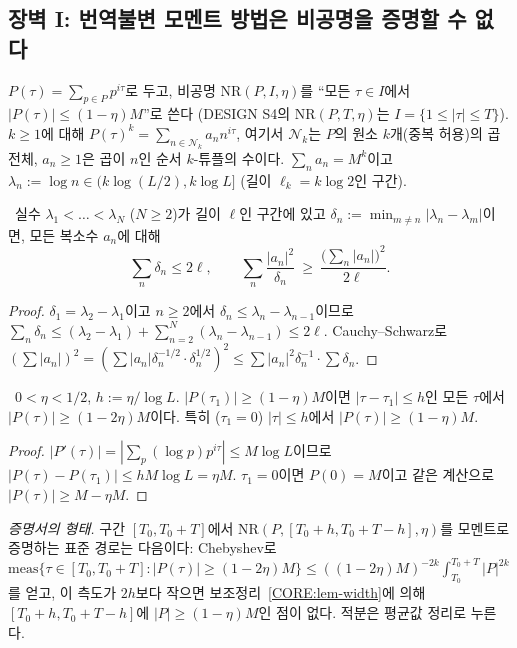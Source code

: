 \subsection{장벽 I: 번역불변 모멘트 방법은 비공명을 증명할 수 없다}
\label{CORE:ssec-barrier1}

$P(\tau)=\sum_{p\in P}p^{i\tau}$로 두고, 비공명 $\mathrm{NR}(P,I,\eta)$를 ``모든 $\tau\in I$에서 $|P(\tau)|\le(1-\eta)M$''로 쓴다 (DESIGN S4의 $\mathrm{NR}(P,T,\eta)$는 $I=\{1\le|\tau|\le T\}$).
$k\ge1$에 대해 $P(\tau)^k=\sum_{n\in\mathcal N_k}a_n n^{i\tau}$, 여기서 $\mathcal N_k$는 $P$의 원소 $k$개(중복 허용)의 곱 전체, $a_n\ge1$은 곱이 $n$인 순서 $k$-튜플의 수이다. $\sum_n a_n=M^k$이고 $\lambda_n:=\log n\in(k\log(L/2),k\log L]$ (길이 $\ell_k=k\log2$인 구간).

\begin{lemma}[간격 합 부등식]\label{CORE:lem-spacing}
\PROVED\ 실수 $\lambda_1<\dots<\lambda_N$ ($N\ge2$)가 길이 $\ell$인 구간에 있고 $\delta_n:=\min_{m\ne n}|\lambda_n-\lambda_m|$이면, 모든 복소수 $a_n$에 대해
\[
\sum_{n}\delta_n\le2\ell,\qquad \sum_n\frac{|a_n|^2}{\delta_n}\ \ge\ \frac{\bigl(\sum_n|a_n|\bigr)^2}{2\ell}.
\]
\end{lemma}
\begin{proof}
$\delta_1=\lambda_2-\lambda_1$이고 $n\ge2$에서 $\delta_n\le\lambda_n-\lambda_{n-1}$이므로 $\sum_n\delta_n\le(\lambda_2-\lambda_1)+\sum_{n=2}^N(\lambda_n-\lambda_{n-1})\le2\ell$. Cauchy–Schwarz로 $(\sum|a_n|)^2=(\sum|a_n|\delta_n^{-1/2}\cdot\delta_n^{1/2})^2\le\sum|a_n|^2\delta_n^{-1}\cdot\sum\delta_n$.
\end{proof}

\begin{lemma}[공명의 폭]\label{CORE:lem-width}
\PROVED\ $0<\eta<1/2$, $h:=\eta/\log L$. $|P(\tau_1)|\ge(1-\eta)M$이면 $|\tau-\tau_1|\le h$인 모든 $\tau$에서 $|P(\tau)|\ge(1-2\eta)M$이다. 특히 ($\tau_1=0$) $|\tau|\le h$에서 $|P(\tau)|\ge(1-\eta)M$.
\end{lemma}
\begin{proof}
$|P'(\tau)|=|\sum_p (\log p)p^{i\tau}|\le M\log L$이므로 $|P(\tau)-P(\tau_1)|\le hM\log L=\eta M$. $\tau_1=0$이면 $P(0)=M$이고 같은 계산으로 $|P(\tau)|\ge M-\eta M$.
\end{proof}

\emph{증명서의 형태.} 구간 $[T_0,T_0+T]$에서 $\mathrm{NR}(P,[T_0+h,T_0+T-h],\eta)$를 모멘트로 증명하는 표준 경로는 다음이다:
Chebyshev로 $\mathrm{meas}\{\tau\in[T_0,T_0+T]:|P(\tau)|\ge(1-2\eta)M\}\le((1-2\eta)M)^{-2k}\int_{T_0}^{T_0+T}|P|^{2k}$를 얻고, 이 측도가 $2h$보다 작으면 보조정리~\ref{CORE:lem-width}에 의해 $[T_0+h,T_0+T-h]$에 $|P|\ge(1-\eta)M$인 점이 없다. 적분은 평균값 정리로 누른다.


